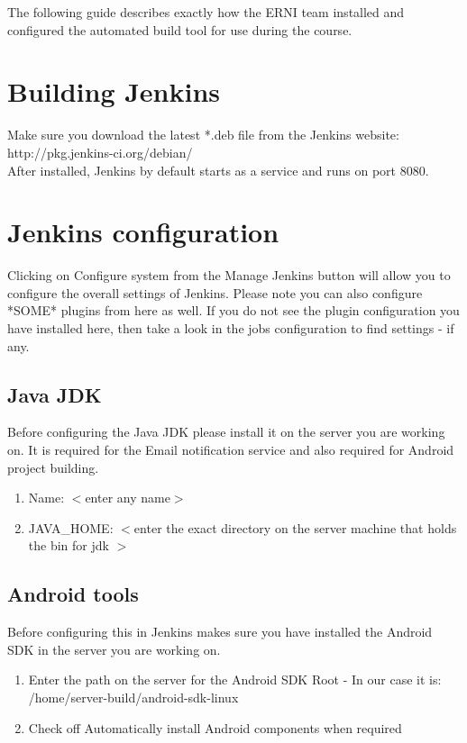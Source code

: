 The following guide describes exactly how the ERNI team installed and configured the automated build tool for use during the course. 

\section{Building Jenkins}
Make sure you download the latest *.deb file from the Jenkins website:\\

http://pkg.jenkins-ci.org/debian/\\

After installed, Jenkins by default starts as a service and runs on port 8080.\\

\section{Jenkins configuration}

Clicking on Configure system  from the Manage Jenkins button will allow you to configure the overall settings of Jenkins. Please note you can also configure *SOME* plugins from here as well. If you do not see the plugin configuration you have installed here, then take a look in the jobs configuration to find settings - if any. 

\subsection {Java JDK}

Before configuring the Java JDK please install it on the server you are working on.
It is required for the Email notification service and also required for Android project building.
\begin{enumerate}
\item Name: $<$enter any name$>$
\item JAVA\_HOME: $<$enter the exact directory on the server machine that holds the bin for jdk $>$ 
\end{enumerate}

\subsection {Android tools}

Before configuring this in Jenkins makes sure you have installed the Android SDK in the server you are working on. 

\begin{enumerate}
\item Enter the path on the server for the Android SDK Root - In our case it is: /home/server-build/android-sdk-linux
\item Check off Automatically install Android components when required
\end{enumerate}
